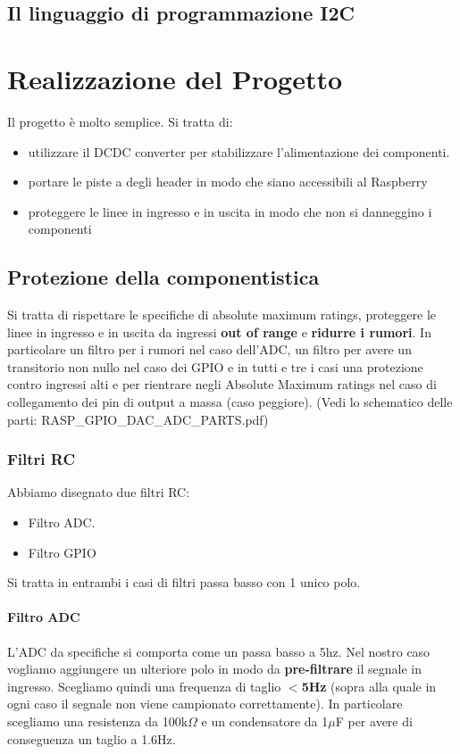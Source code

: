 \documentclass[10pt]{article}
\begin{document}
	\subsection{Il linguaggio di programmazione I2C}\label{sec:i2c}

\section{Realizzazione del Progetto}
		Il progetto è molto semplice. Si tratta di:
		\begin{itemize}
		        \item utilizzare il DCDC converter per stabilizzare l'alimentazione dei componenti.
		        \item portare le piste a degli header in modo che siano accessibili al Raspberry
		        \item proteggere le linee in ingresso e in uscita in modo che non si danneggino i componenti
		\end{itemize}

	\subsection{Protezione della componentistica}
		Si tratta di rispettare le specifiche di absolute maximum ratings, proteggere le linee in ingresso e in uscita da ingressi \textbf{out of range} e \textbf{ridurre i rumori}.
		In particolare un filtro per i rumori nel caso dell'ADC, un filtro per avere un transitorio non nullo nel caso dei GPIO e in tutti e tre i casi una protezione contro ingressi alti e per rientrare negli Absolute Maximum ratings nel caso di collegamento dei pin di output a massa (caso peggiore).
		(Vedi lo schematico delle parti: RASP\_GPIO\_DAC\_ADC\_PARTS.pdf)
		\subsubsection{Filtri RC}
		Abbiamo disegnato due filtri RC:
		\begin{itemize}
		        \item Filtro ADC.
		        \item Filtro GPIO
		\end{itemize}
		Si tratta in entrambi i casi di filtri passa basso con 1 unico polo.
			\paragraph{Filtro ADC}
				L'ADC da specifiche si comporta come un passa basso a 5hz. Nel nostro caso vogliamo aggiungere un ulteriore polo in modo da \textbf{pre-filtrare} il segnale in ingresso.
				Scegliamo quindi una frequenza di taglio \textbf{\(<\)5Hz} (sopra alla quale in ogni caso il segnale non viene campionato correttamente).
				In particolare scegliamo una resistenza da 100k\(\Omega\) e un condensatore da 1\(\mu\)F per avere di conseguenza un taglio a 1.6Hz.
\end{document}
